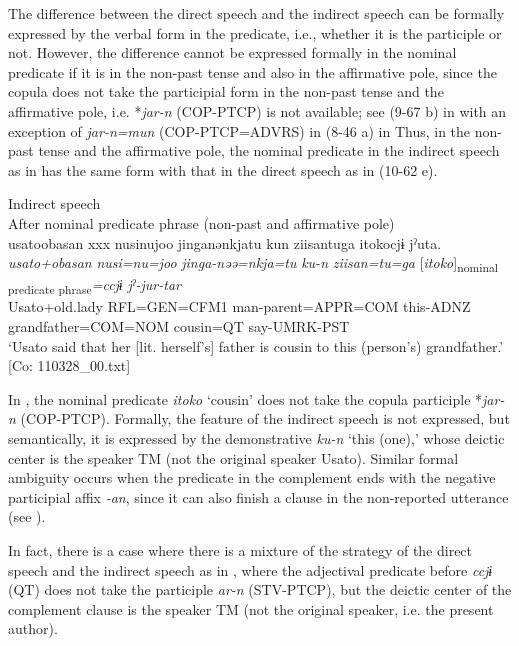 \begin{xlist}
The difference between the direct speech and the indirect speech can be formally expressed by the verbal form in the predicate, i.e., whether it is the participle or not. However, the difference cannot be expressed formally in the nominal predicate if it is in the non-past tense and also in the affirmative pole, since the copula does not take the participial form in the non-past tense and the affirmative pole, i.e. *\textit{jar-n} (COP-PTCP) is not available; see (9-67 b) in  with an exception of \textit{jar-n=mun} (COP-PTCP=ADVRS) in (8-46 a) in  Thus, in the non-past tense and the affirmative pole, the nominal predicate in the indirect speech as in  has the same form with that in the direct speech as in (10-62 e).

\ea\label{ex:10.64}   Indirect speech\\
  After nominal predicate phrase (non-past and affirmative pole)\\
      \glll    usato{\textbar}obasan{\textbar}  xxx  nusinujoo  jinganənkjatu  kun  ziisantuga  {\textbar}itoko{\textbar}cjɨ   jˀuta.\\
    \textit{usato+obasan}    \textit{nusi=nu=joo}  \textit{jinga-nəə=nkja=tu}  \textit{ku-n}  \textit{ziisan=tu=ga}  [\textit{itoko}]\textsubscript{nominal predicate phrase}\textit{=ccjɨ} \textit{jˀ{}-jur-tar}\\
    Usato+old.lady    RFL=GEN=CFM1  man-parent=APPR=COM this-ADNZ  grandfather=COM=NOM  cousin=QT   say-UMRK-PST\\
    \glt ‘Usato said that her [lit. herself’s] father is cousin to this (person’s) grandfather.’ [Co: 110328\_00.txt]
\z

In , the nominal predicate \textit{itoko} ‘cousin’ does not take the copula participle *\textit{jar-n} (COP-PTCP). Formally, the feature of the indirect speech is not expressed, but semantically, it is expressed by the demonstrative \textit{ku-n} ‘this (one),’ whose deictic center is the speaker TM (not the original speaker Usato). Similar formal ambiguity occurs when the predicate in the complement ends with the negative participial affix \textit{{}-an}, since it can also finish a clause in the non-reported utterance (see ).

  In fact, there is a case where there is a mixture of the strategy of the direct speech and the indirect speech as in , where the adjectival predicate before \textit{ccjɨ} (QT) does not take the participle \textit{ar-n} (STV-PTCP), but the deictic center of the complement clause is the speaker TM (not the original speaker, i.e. the present author).


\end{xlist}
